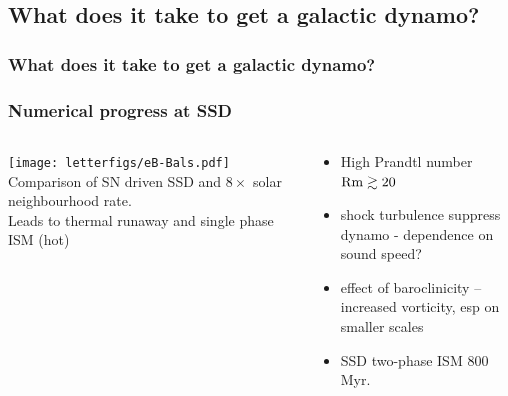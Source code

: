 \documentclass{beamer}
\newcommand\Rm{{\rm Rm} }
\begin{document}
  \subsection{What does it take to get a galactic dynamo?} 
    \begin{frame}
      \frametitle{What does it take to get a galactic dynamo?}
    \end{frame}
    \begin{frame}
      \frametitle{Numerical progress at SSD}
    \begin{columns}
      \begin{column}[]{6.5cm}
      \texttt{[image: letterfigs/eB-Bals.pdf]}
      {\footnotesize{
      Comparison of SN driven SSD \cite{BKMM04} and \cite{GMKS22} 
      $8\times$ solar neighbourhood rate.\\
      Leads to thermal runaway \cite{LOCBN15} and single phase ISM (hot)}} 
      \end{column}
      \begin{column}[]{5.0cm}
      {\footnotesize{
      \begin{itemize}
        \item High Prandtl number $\Rm\gtrsim20$ \cite{SBK02,HB04,Schober12,SBSW20} 
        \item shock turbulence suppress dynamo \cite{Haugen:2004M,FCSBKS11,FSBS14} - dependence on sound speed?
        \item effect of baroclinicity -- increased vorticity, esp on smaller scales \cite{Federrath:2010,KGVS18,GMKS22}
        \item SSD two-phase ISM \cite{SF22} 800 Myr.
      \end{itemize}
       \vspace{-0.2cm}
      }}
      \end{column}
    \end{columns}
    \end{frame}
\end{document}
